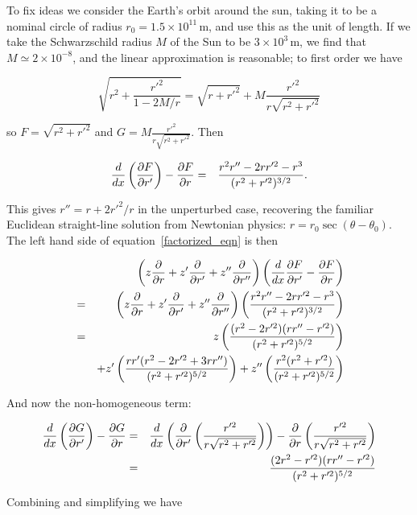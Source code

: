 \documentclass[pdflatex,sn-mathphys-num]{sn-jnl}%
\theoremstyle{thmstyleone}%
\theoremstyle{thmstyletwo}%
\theoremstyle{thmstylethree}%
\begin{document}
To fix ideas we consider the Earth's orbit around the sun, taking it
to be a nominal circle of radius $r_0=1.5\times 10^{11}\,\mathrm{m}$,
and use this as the unit of length.  If we take the Schwarzschild
radius $M$ of the Sun to be $3\times 10^3\,\mathrm{m}$, we find that
$M\simeq 2\times 10^{-8}$, and the linear approximation is reasonable;
to first order we have

\begin{equation}
\sqrt{r^2 + \frac{r'^2}{1-2M/r}}=\sqrt{r+r'^2} + M\frac{r'^2}{r\sqrt{r^2 + r'^2}}
\end{equation}
  
so $F=\sqrt{r^2+r'^2}$ and $G=M\frac{r'^2}{r\sqrt{r^2+r'^2}}$.  Then

\begin{eqnarray}
\frac{d}{dx}\left(\frac{\partial{F}}{\partial{r'}}\right) -\frac{\partial{F}}{\partial{r}} &=& 
\frac{r^2r''- 2rr'^2 -r^3}{(r^2 +r'^2)^{3/2}}.
\end{eqnarray}

This gives $r'' = r + 2r'^2/r$ in the unperturbed case, recovering the
familiar Euclidean straight-line solution from Newtonian physics:
$r=r_0\sec(\theta-\theta_0)$.  The left hand side of
equation~\ref{factorized_eqn} is then

\begin{eqnarray}
&{}& \left(z\frac{\partial{}}{\partial{r}} + z'\frac{\partial{}}{\partial{r'}} + z''\frac{\partial{}}{\partial{r''}}\right)
\left(\frac{d}{dx}\frac{\partial{F}}{\partial{r'}}
-\frac{\partial{F}}{\partial{r}}\right)\nonumber\\
&=&  \left(z\frac{\partial{}}{\partial{r}} + z'\frac{\partial{}}{\partial{r'}} + z''\frac{\partial{}}{\partial{r''}}\right)
\left(\frac{r^2r''- 2rr'^2 -r^3}{(r^2 +r'^2)^{3/2}}\right)\nonumber\\
&=& 
 z  \left(\frac{(r^2 - 2r'^2)(rr''-r'^2)}{(r^2 + r'^2)^{5/2}}\right)\nonumber\\
 &{}& + z' \left(\frac{rr'(r^2 - 2r'^2 + 3rr'')}{(r^2 + r'^2)^{5/2}}\right)
      + z''\left(\frac{r^2    (r^2+r'^2)       }{(r^2 + r'^2)^{5/2}}\right)
\end{eqnarray}

And now the non-homogeneous term:

\begin{eqnarray}
\frac{d}{dx}\left(\frac{\partial{G}}{\partial{r'}}\right) -\frac{\partial{G}}{\partial{r}} &=& 
\frac{d}{dx}\left(\frac{\partial}{\partial r'}\left(\frac{r'^2}{r\sqrt{r^2+r'^2}}\right)\right)
- \frac{\partial}{\partial
  r}\left(\frac{r'^2}{r\sqrt{r^2+r'^2}}\right)\nonumber\\
&=& \frac{(2r^2-r'^2)(rr''-r'^2)}{(r^2+r'^2)^{5/2}}
\end{eqnarray}

Combining and simplifying we have
\end{document}
